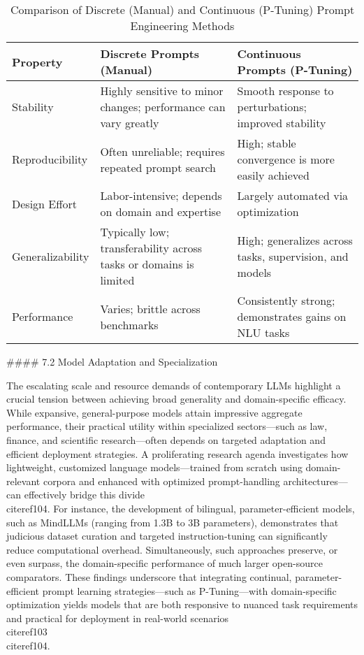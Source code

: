 \documentclass[11pt]{article}
\begin{document}
\begin{table}[ht]
\centering
\caption{Comparison of Discrete (Manual) and Continuous (P-Tuning) Prompt Engineering Methods}
\label{tab:prompt_comparison}
\begin{tabular}{|l|p{4cm}|p{4cm}|}
\hline
\textbf{Property}       & \textbf{Discrete Prompts (Manual)}                                    & \textbf{Continuous Prompts (P-Tuning)}                    \\
\hline
Stability             & Highly sensitive to minor changes; performance can vary greatly        & Smooth response to perturbations; improved stability       \\
\hline
Reproducibility       & Often unreliable; requires repeated prompt search                      & High; stable convergence is more easily achieved           \\
\hline
Design Effort         & Labor-intensive; depends on domain and expertise                       & Largely automated via optimization                        \\
\hline
Generalizability      & Typically low; transferability across tasks or domains is limited      & High; generalizes across tasks, supervision, and models    \\
\hline
Performance           & Varies; brittle across benchmarks                                      & Consistently strong; demonstrates gains on NLU tasks       \\
\hline
\end{tabular}
\end{table}

#### 7.2 Model Adaptation and Specialization

The escalating scale and resource demands of contemporary LLMs highlight a crucial tension between achieving broad generality and domain-specific efficacy. While expansive, general-purpose models attain impressive aggregate performance, their practical utility within specialized sectors—such as law, finance, and scientific research—often depends on targeted adaptation and efficient deployment strategies. A proliferating research agenda investigates how lightweight, customized language models—trained from scratch using domain-relevant corpora and enhanced with optimized prompt-handling architectures—can effectively bridge this divide \\cite{ref104}. For instance, the development of bilingual, parameter-efficient models, such as MindLLMs (ranging from 1.3B to 3B parameters), demonstrates that judicious dataset curation and targeted instruction-tuning can significantly reduce computational overhead. Simultaneously, such approaches preserve, or even surpass, the domain-specific performance of much larger open-source comparators. These findings underscore that integrating continual, parameter-efficient prompt learning strategies—such as P-Tuning—with domain-specific optimization yields models that are both responsive to nuanced task requirements and practical for deployment in real-world scenarios \\cite{ref103}\\cite{ref104}.
\end{document}
